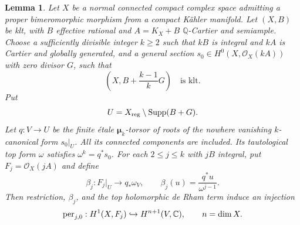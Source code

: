 \documentclass[11pt,a4paper]{article}
\numberwithin{equation}{section}
\newtheorem{lemma}[theorem]{Lemma}
\theoremstyle{definition}
\theoremstyle{remark}
\newcommand{\Q}{\mathbb Q}\newcommand{\R}{\mathbb R}
\newcommand{\C}{\mathbb C}\newcommand{\Z}{\mathbb Z}
\newcommand{\OO}{\mathcal O}\newcommand{\cX}{\mathcal X}
\newcommand{\Supp}{\operatorname{Supp}}\newcommand{\Sing}{\operatorname{Sing}}
\begin{document}
\begin{lemma}\label{lem:period-j}
Let $X$ be a normal connected compact complex space admitting a proper
bimeromorphic morphism from a compact Kähler manifold. Let $(X,B)$ be
klt, with $B$ effective rational and $A=K_X+B$ $\Q$-Cartier and
semiample. Choose a sufficiently divisible integer $k\ge2$ such that
$kB$ is integral and $kA$ is Cartier and globally generated,
and a general section $s_0\in H^0(X,\OO_X(kA))$ with zero divisor $G$,
such that
\[
 \left(X,B+\frac{k-1}{k}G\right)\quad\text{is klt}.
\]
Put
\[
 U=X_{\reg}\setminus\Supp(B+G).
\]
Let $q:V\to U$ be the finite étale $\boldsymbol\mu_k$-torsor of roots
of the nowhere vanishing $k$-canonical form $s_0|_U$. All its connected
components are included. Its tautological top form $\omega$ satisfies
$\omega^k=q^*s_0$. For each $2\le j\le k$
with $jB$ integral, put $F_j=\OO_X(jA)$ and define
\begin{equation}\label{eq:beta-j}
 \beta_j:F_j|_U\longrightarrow q_*\omega_V,\qquad
 \beta_j(u)=\frac{q^*u}{\omega^{j-1}}.
\end{equation}
Then restriction, $\beta_j$, and the top holomorphic de Rham term induce
an injection
\begin{equation}\label{eq:period-j}
 \per_{j,0}:H^1(X,F_j)\hookrightarrow H^{n+1}(V,\C),
 \qquad n=\dim X.
\end{equation}
\end{lemma}
\end{document}
